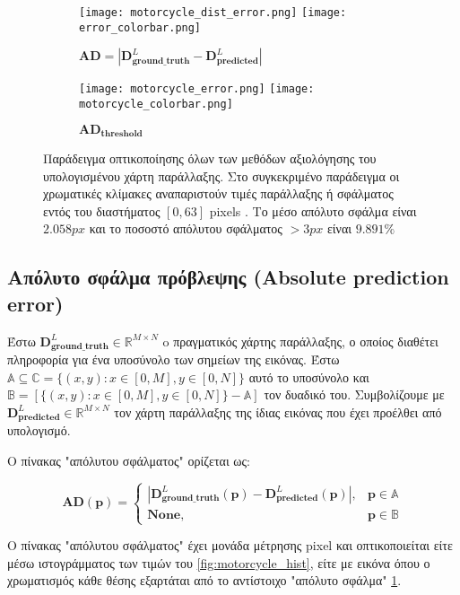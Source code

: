 \begin{figure}
	
	\begin{subfigure}{0.48\textwidth}
		\texttt{[image: motorcycle\_dist\_error.png]}
		\texttt{[image: error\_colorbar.png]}
		\caption{$\mathbf{AD} = |\mathbf{D}_{\mathbf{ground\_truth}}^L - \mathbf{D}_{\mathbf{predicted}}^L|$}
		\label{fig:motorcycle_dist_error}
	\end{subfigure}
	\begin{subfigure}{0.48\textwidth}
		\texttt{[image: motorcycle\_error.png]}
		\texttt{[image: motorcycle\_colorbar.png]}
		\caption{$\mathbf{AD_{threshold}}$}
		\label{fig:motorcycle_dist_error_thres}
	\end{subfigure}
	\caption{Παράδειγμα οπτικοποίησης όλων των μεθόδων αξιολόγησης του υπολογισμένου χάρτη παράλλαξης. Στο συγκεκριμένο παράδειγμα οι χρωματικές κλίμακες αναπαριστούν τιμές παράλλαξης ή σφάλματος εντός του διαστήματος $[0,63]$ \e pixels \g. Το μέσο απόλυτο σφάλμα είναι $2.058 px$ και το ποσοστό απόλυτου σφάλματος $>3 px$ είναι $9.891\%$}
\end{figure}

\subsection{Απόλυτο σφάλμα πρόβλεψης \texorpdfstring{\e (Absolute prediction error) \g}{TEXT}}

Έστω $\mathbf{D}_{\mathbf{ground\_truth}}^L \in \mathbb{R}^{M\times N}$ o πραγματικός χάρτης παράλλαξης, ο οποίος διαθέτει πληροφορία για ένα υποσύνολο των σημείων της εικόνας. Έστω $\mathbb{A} \subseteq \mathbb{C}=\{(x,y):x\in [0,M],y\in [0,N]\}$ αυτό το υποσύνολο και $\mathbb{B} = \left[\{(x,y):x\in [0,M],y\in [0,N]\} - \mathbb{A}\right]$ τον δυαδικό του. Συμβολίζουμε με $\mathbf{D}_{\mathbf{predicted}}^L \in \mathbb{R}^{M\times N}$ τον χάρτη παράλλαξης της ίδιας εικόνας που έχει προέλθει από υπολογισμό.

O πίνακας "απόλυτου σφάλματος" ορίζεται ως:

$$
\mathbf{AD}(\mathbf{p}) = 
\begin{cases}
|\mathbf{D}_{\mathbf{ground\_truth}}^L(\mathbf{p}) - \mathbf{D}_{\mathbf{predicted}}^L(\mathbf{p})|, & \mathbf{p}\in \mathbb{A}\\
\mathbf{None}, & \mathbf{p}\in \mathbb{B}
\end{cases}
$$


Ο πίνακας "απόλυτου σφάλματος" έχει μονάδα μέτρησης \e pixel \g και οπτικοποιείται είτε μέσω ιστογράμματος των τιμών του \ref{fig:motorcycle_hist}, είτε με εικόνα όπου ο χρωματισμός κάθε θέσης εξαρτάται από το αντίστοιχο "απόλυτο σφάλμα" \ref{fig:motorcycle_dist_error}.

